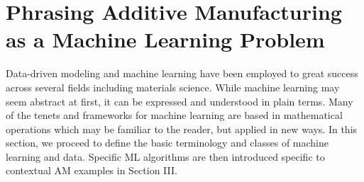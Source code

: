 \section{Phrasing Additive Manufacturing as a Machine Learning Problem}\label{phrasing}
Data-driven modeling and machine learning have been employed to great success across several fields including materials science. While machine learning may seem abstract at first, it can be expressed and understood in plain terms. Many of the tenets and frameworks for machine learning are based in mathematical operations which may be familiar to the reader, but applied in new ways. In this section, we proceed to define the basic terminology and classes of machine learning and data. Specific ML algorithms are then introduced specific to contextual AM examples in Section III.






